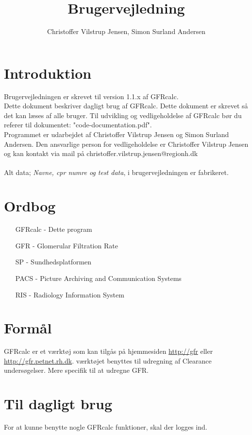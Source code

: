 \documentclass{article}
\author{Christoffer Vilstrup Jensen, Simon Surland Andersen}
\title{Brugervejledning}
\begin{document}
\tableofcontents
\section*{Introduktion}
Brugervejledningen er skrevet til version 1.1.x af GFRcalc.\\

Dette dokument beskriver dagligt brug af GFRcalc. Dette dokument er skrevet så det kan læses af alle bruger. Til udvikling og vedligeholdelse af GFRcalc bør du referer til dokumentet: "code-documentation.pdf".\\

Programmet er udarbejdet af Christoffer Vilstrup Jensen og Simon Surland Andersen. Den ansvarlige person for vedligeholdelse er Christoffer Vilstrup Jensen og kan kontakt via mail på christoffer.vilstrup.jensen@regionh.dk\\\\
Alt data; \textit{Navne, cpr numre og test data}, i brugervejledningen er fabrikeret.

\section*{Ordbog}
\begin{itemize}
	\item[GFRcalc] 	- Dette program
	\item[GFR]     	- Glomerular Filtration Rate
	\item[SP]      	- Sundhedsplatformen
	\item[PACS]	   	- Picture Archiving and Communication Systems
	\item[RIS]		- Radiology Information System
\end{itemize}
\section*{Formål}
GFRcalc er et værktøj som kan tilgås på hjemmesiden \url{http://gfr} eller \url{http://gfr.petnet.rh.dk}. værktøjet benyttes til udregning af Clearance undersøgelser. Mere specifik til at udregne GFR. 
\newpage
\section{Til dagligt brug}
For at kunne benytte nogle GFRcalc funktioner, skal der logges ind.
\end{document}

